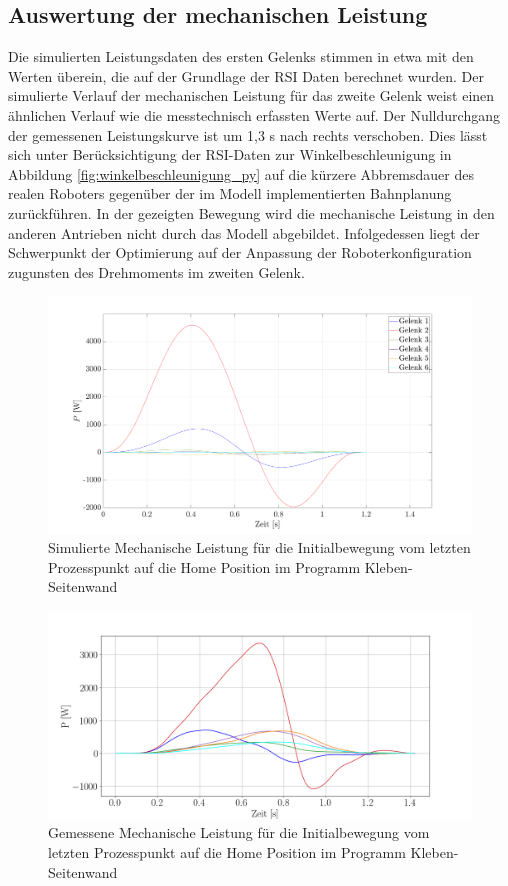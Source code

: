 \subsection*{Auswertung der mechanischen Leistung}
Die simulierten Leistungsdaten des ersten Gelenks stimmen in etwa mit den Werten überein, die auf der Grundlage der RSI Daten berechnet wurden. Der simulierte Verlauf der mechanischen Leistung für das zweite Gelenk weist einen ähnlichen Verlauf wie die messtechnisch erfassten Werte auf. Der Nulldurchgang der gemessenen Leistungskurve ist um 1,3 s nach rechts verschoben.  Dies lässt sich unter Berücksichtigung der RSI-Daten zur Winkelbeschleunigung in Abbildung \ref{fig:winkelbeschleunigung_py} auf die kürzere Abbremsdauer des realen Roboters gegenüber der im Modell implementierten Bahnplanung  zurückführen. In der gezeigten Bewegung wird die mechanische Leistung in den anderen Antrieben nicht durch das Modell abgebildet. Infolgedessen liegt der Schwerpunkt der Optimierung auf der Anpassung der Roboterkonfiguration zugunsten des Drehmoments im zweiten Gelenk. 

\begin{figure}[tbph]
	\centering
	\includegraphics[width=1\linewidth]{images/pmat}
	\caption{Simulierte Mechanische Leistung für die Initialbewegung vom letzten Prozesspunkt auf die  Home Position im Programm Kleben-Seitenwand}
	\label{fig:pmat}
\end{figure}
%
\begin{figure}[tbph]
	\centering
	\includegraphics[width=1\linewidth]{images/p}
	\caption{Gemessene Mechanische Leistung für die Initialbewegung vom letzten Prozesspunkt auf die  Home Position im Programm Kleben-Seitenwand}
	\label{fig:p}
\end{figure}

